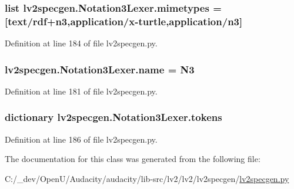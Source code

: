 \subsubsection[{\texorpdfstring{mimetypes}{mimetypes}}]{\setlength{\rightskip}{0pt plus 5cm}list lv2specgen.\+Notation3\+Lexer.\+mimetypes = \mbox{[}\textquotesingle{}text/{\bf rdf}+n3\textquotesingle{},\textquotesingle{}application/x-\/turtle\textquotesingle{},\textquotesingle{}application/n3\textquotesingle{}\mbox{]}\hspace{0.3cm}{\ttfamily [static]}}\hypertarget{classlv2specgen_1_1_notation3_lexer_ae457f5311e2466d8b3b017f987d7de79}{}\label{classlv2specgen_1_1_notation3_lexer_ae457f5311e2466d8b3b017f987d7de79}


Definition at line 184 of file lv2specgen.\+py.

\subsubsection[{\texorpdfstring{name}{name}}]{ lv2specgen.\+Notation3\+Lexer.\+name = \textquotesingle{}N3\textquotesingle{}\hspace{0.3cm}{\ttfamily [static]}}\hypertarget{classlv2specgen_1_1_notation3_lexer_a8068e4cce7ca73de902cb5927a28f4f7}{}\label{classlv2specgen_1_1_notation3_lexer_a8068e4cce7ca73de902cb5927a28f4f7}


Definition at line 181 of file lv2specgen.\+py.

\subsubsection[{\texorpdfstring{tokens}{tokens}}]{\setlength{\rightskip}{0pt plus 5cm}dictionary lv2specgen.\+Notation3\+Lexer.\+tokens\hspace{0.3cm}{\ttfamily [static]}}\hypertarget{classlv2specgen_1_1_notation3_lexer_a435bf1f767205c233aac68c53c256422}{}\label{classlv2specgen_1_1_notation3_lexer_a435bf1f767205c233aac68c53c256422}


Definition at line 186 of file lv2specgen.\+py.



The documentation for this class was generated from the following file\+:\begin{DoxyCompactItemize}
\item 
C\+:/\+\_\+dev/\+Open\+U/\+Audacity/audacity/lib-\/src/lv2/lv2/lv2specgen/\hyperlink{lv2specgen_8py}{lv2specgen.\+py}\end{DoxyCompactItemize}
